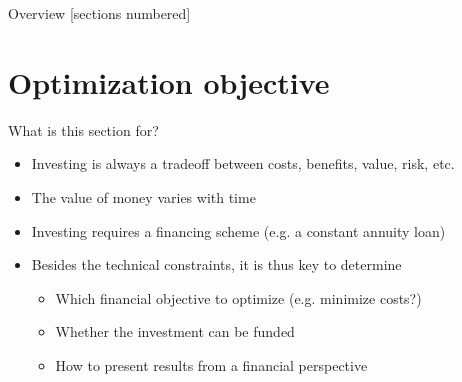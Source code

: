 \begin{frame}{Overview}
  [sections numbered]
  \tableofcontents[hideallsubsections]
\end{frame}

\section{Optimization objective}

\begin{frame}{What is this section for?}
\begin{itemize}
    \item Investing is always a tradeoff between costs, benefits, value, risk, 
    etc.
    \item The value of money varies with time
    \item Investing requires a financing scheme (e.g. a constant annuity loan)
    \item Besides the technical constraints, it is thus key to determine 
    \begin{itemize}
        \item Which financial objective to optimize (e.g. minimize costs?)
        \item Whether the investment can be funded
        \item How to present results from a financial perspective
    \end{itemize}
\end{itemize}
\end{frame}

